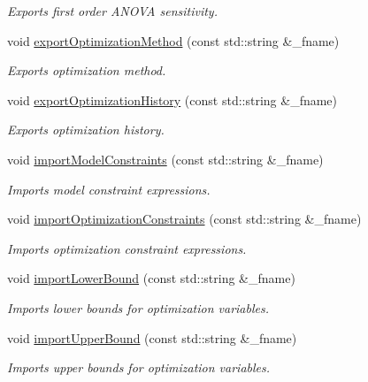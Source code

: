 \begin{DoxyCompactItemize}
\begin{DoxyCompactList}\small\item\em Exports first order A\-N\-O\-V\-A sensitivity. \end{DoxyCompactList}\item 
void \hyperlink{class_go_s_u_m_1_1_c_container_ad8c30745006224e5c7e1187633b5c5c1}{export\-Optimization\-Method} (const std\-::string \&\-\_\-fname)
\begin{DoxyCompactList}\small\item\em Exports optimization method. \end{DoxyCompactList}\item 
void \hyperlink{class_go_s_u_m_1_1_c_container_a3672d46d968ffcd2b944f22e90155759}{export\-Optimization\-History} (const std\-::string \&\-\_\-fname)
\begin{DoxyCompactList}\small\item\em Exports optimization history. \end{DoxyCompactList}\item 
void \hyperlink{class_go_s_u_m_1_1_c_container_ad1505a7068e2f1e588c1819eabda451b}{import\-Model\-Constraints} (const std\-::string \&\-\_\-fname)
\begin{DoxyCompactList}\small\item\em Imports model constraint expressions. \end{DoxyCompactList}\item 
void \hyperlink{class_go_s_u_m_1_1_c_container_a34fc441645bae3ad13057a2eac8f802d}{import\-Optimization\-Constraints} (const std\-::string \&\-\_\-fname)
\begin{DoxyCompactList}\small\item\em Imports optimization constraint expressions. \end{DoxyCompactList}\item 
void \hyperlink{class_go_s_u_m_1_1_c_container_a21c8853e82347f8421ab6e80fed4618b}{import\-Lower\-Bound} (const std\-::string \&\-\_\-fname)
\begin{DoxyCompactList}\small\item\em Imports lower bounds for optimization variables. \end{DoxyCompactList}\item 
void \hyperlink{class_go_s_u_m_1_1_c_container_a1dffaadac10b82a94cac8e12bbc4dd92}{import\-Upper\-Bound} (const std\-::string \&\-\_\-fname)
\begin{DoxyCompactList}\small\item\em Imports upper bounds for optimization variables. \end{DoxyCompactList}\item 

\end{DoxyCompactItemize}
